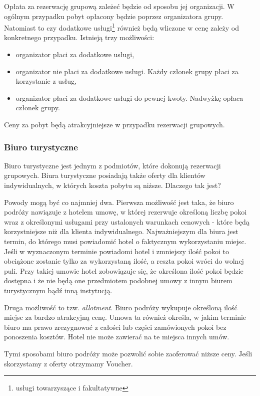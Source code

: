 \documentclass[a4paper,onecolumn,oneside,11pt,wide,floatssmall]{mwrep}
\theoremstyle{definition}
\theoremstyle{plain}%
\theoremstyle{remark}
\begin{document}
Opłata za rezerwację grupową zależeć będzie od sposobu jej organizacji. W 
ogólnym przypadku pobyt opłacony będzie poprzez organizatora grupy. 
Natomiast to czy dodatkowe usługi\footnote{usługi towarzyszące i fakultatywne}
 również będą wliczone w cenę zależy od konkretnego przypadku. Istnieją trzy 
 możliwości:

\begin{itemize}
   \item organizator płaci za dodatkowe usługi,
   \item organizator nie płaci za dodatkowe usługi. Każdy członek grupy 
   płaci za korzystanie z usług,
   \item organizator płaci za dodatkowe usługi do pewnej kwoty. Nadwyżkę 
   opłaca członek grupy.
\end{itemize}

Ceny za pobyt będą atrakcyjniejsze w przypadku rezerwacji grupowych.

\subsubsection{Biuro turystyczne}
\label{biuro-turystyczne}
Biuro turystyczne jest jednym z podmiotów, które dokonują rezerwacji 
grupowych. Biura turystyczne posiadają także oferty dla klientów 
indywidualnych, w których koszta pobytu są niższe. Dlaczego tak jest?

Powody mogą być co najmniej dwa. Pierwsza możliwość jest taka, że biuro 
podróży nawiązuje z hotelem umowę, w której rezerwuje określoną liczbę 
pokoi wraz z określonymi usługami przy ustalonych warunkach cenowych - 
które będą korzystniejsze niż dla klienta indywidualnego. Najważniejszym dla 
biura jest termin, do którego musi powiadomić hotel o faktycznym 
wykorzystaniu miejsc. Jeśli w wyznaczonym terminie powiadomi hotel i 
zmniejszy ilość pokoi to obciążone zostanie tylko za wykorzystaną ilość, a 
reszta pokoi wróci do wolnej puli. Przy takiej umowie hotel zobowiązuje się, 
że określona ilość pokoi będzie dostępna i że nie będą one przedmiotem 
podobnej umowy z innym biurem turystycznym bądź inną instytucją.

Druga możliwość to tzw. \emph{allotment}. Biuro podróży wykupuje określoną 
ilość miejsc za bardzo atrakcyjną cenę. Umowa ta również określa, w jakim 
terminie biuro ma prawo zrezygnować z całości lub części zamówionych pokoi 
bez ponoszenia kosztów. Hotel nie może zawierać na te miejsca innych umów.

Tymi sposobami biuro podróży może pozwolić sobie zaoferować niższe ceny. 
Jeśli skorzystamy z oferty otrzymamy Voucher.
\end{document}
